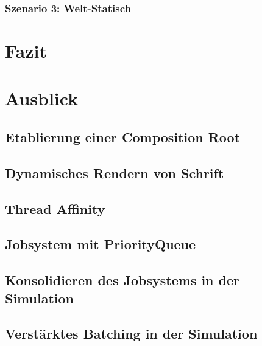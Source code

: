 \documentclass[12pt,a4paper,listof=totocnumbered,parskip=half,numbers=noenddot]{scrartcl}
\begin{document}
\subsubsection{Szenario 3: Welt-Statisch}

%
%

\pagebreak
\section{Fazit}
\pagebreak
\section{Ausblick}
\subsection{Etablierung einer Composition Root}

\subsection{Dynamisches Rendern von Schrift}
\subsection{Thread Affinity}
\subsection{Jobsystem mit PriorityQueue}
\subsection{Konsolidieren des Jobsystems in der Simulation}
\subsection{Verstärktes Batching in der Simulation}
\printnoidxglossary[type=main,style=longheader]
\printnoidxglossary[type=acronym,style=longheader]

\pagebreak
\printbibliography[title={Literaturverzeichnis},heading=bibintoc,notkeyword=online]

\pagebreak
\printbibliography[title={Quellenverzeichnis},heading=bibintoc,keyword=online] 



\end{document}
